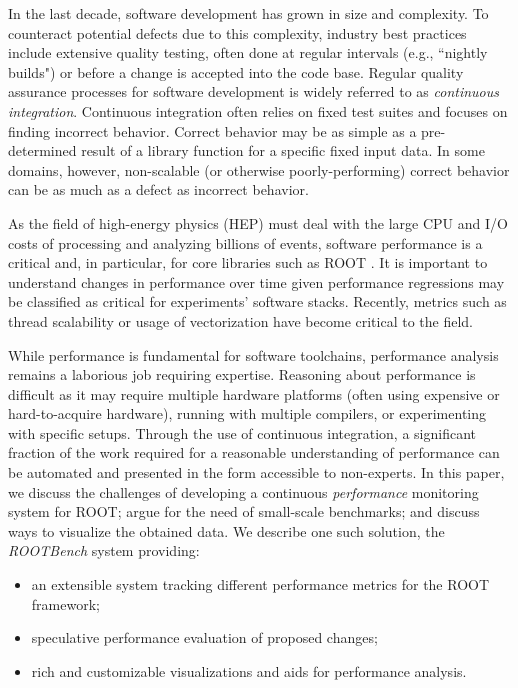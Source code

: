 \documentclass{webofc}
\begin{document}
In the last decade, software development has grown in size and complexity. To counteract potential defects due to this complexity, industry best practices include extensive quality testing, often done at regular intervals (e.g., ``nightly builds") or before a change is accepted into the code base. Regular quality assurance processes for software development is widely referred to as \textit{continuous integration}. Continuous integration often relies on fixed test suites and focuses on finding incorrect behavior. Correct behavior may be as simple as a pre-determined result of a library function for a specific fixed input data. In some domains, however, non-scalable (or otherwise poorly-performing) correct behavior can be as much as a defect as incorrect behavior.

As the field of high-energy physics (HEP) must deal with the large CPU and I/O costs of processing and analyzing billions of events, software performance is a critical and, in particular, for core libraries such as ROOT \cite{root}. It is important to understand changes in performance over time given performance regressions may be classified as critical for experiments' software stacks. Recently, metrics such as thread scalability or usage of vectorization have become critical to the field.

While performance is fundamental for software toolchains, performance analysis remains a laborious job requiring expertise. Reasoning about performance is difficult as it may require multiple hardware platforms (often using expensive or hard-to-acquire hardware), running with multiple compilers, or experimenting with specific setups. Through the use of continuous integration, a significant fraction of the work required for a reasonable understanding of performance can be automated and presented in the form accessible to non-experts. In this paper, we discuss the challenges of developing a continuous \textit{performance} monitoring system for ROOT; argue for the need of small-scale benchmarks; and discuss ways to visualize the obtained data. We describe one such solution, the \textit{ROOTBench} system providing:
\begin{itemize}
\item an extensible system tracking different performance metrics for the ROOT framework;
\item speculative performance evaluation of proposed changes;
\item rich and customizable visualizations and aids for performance analysis.
\end{itemize}
\end{document}
